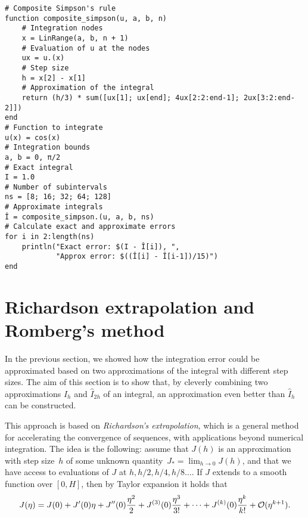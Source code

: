 \begin{verbatim}
# Composite Simpson's rule
function composite_simpson(u, a, b, n)
    # Integration nodes
    x = LinRange(a, b, n + 1)
    # Evaluation of u at the nodes
    ux = u.(x)
    # Step size
    h = x[2] - x[1]
    # Approximation of the integral
    return (h/3) * sum([ux[1]; ux[end]; 4ux[2:2:end-1]; 2ux[3:2:end-2]])
end
# Function to integrate
u(x) = cos(x)
# Integration bounds
a, b = 0, π/2
# Exact integral
I = 1.0
# Number of subintervals
ns = [8; 16; 32; 64; 128]
# Approximate integrals
Î = composite_simpson.(u, a, b, ns)
# Calculate exact and approximate errors
for i in 2:length(ns)
    println("Exact error: $(I - Î[i]), ",
            "Approx error: $((Î[i] - Î[i-1])/15)")
end
\end{verbatim}

\section{Richardson extrapolation and Romberg's method}
In the previous section,
we showed how the integration error could be approximated based on two approximations of the integral with different step sizes.
The aim of this section is to show that,
by cleverly combining two approximations $\widehat I_h$ and $\widehat I_{2h}$ of an integral,
an approximation even better than $\widehat I_h$ can be constructed.

This approach is based on \emph{Richardson's extrapolation},
which is a general method for accelerating the convergence of sequences,
with applications beyond numerical integration.
The idea is the following:
assume that $J(h)$ is an approximation with step size~$h$ of some unknown quantity~$J_* = \lim_{h\to 0} J(h)$,
and that we have access to evaluations of $J$ at $h, h/2, h/4, h/8 \dotsc$.
If $J$ extends to a smooth function over $[0, H]$,
then by Taylor expansion it holds that
\[
    J(\eta) = J(0) + J'(0) \eta + J''(0) \frac{\eta^2}{2} + J^{(3)}(0) \frac{\eta^3}{3!} + \dotsb + J^{(k)}(0) \frac{\eta^k}{k!} + \mathcal O(\eta^{k+1}).
\]

